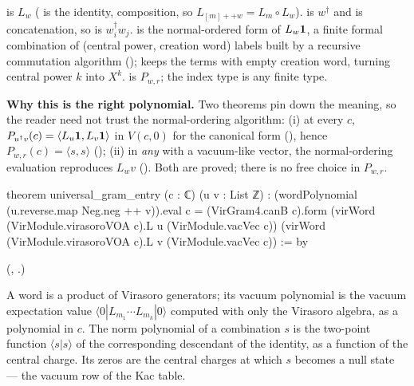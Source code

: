 \begin{dictionary}
 is $L_w$ ( is the identity, \lean{*} composition, so $L_{[m]++w} = L_m\circ L_w$).
 is $w^\dagger$ and \lean{++} is concatenation, so
 is $w_i^\dagger w_j$.  is the normal-ordered form
of $L_w\mathbf{1}$, a finite formal combination of (central power, creation word) labels built by a recursive
commutation algorithm (); 
keeps the terms with empty creation word, turning central power $k$ into $X^k$. 
is $P_{w,r}$; the index type  is any finite type.

\textbf{Why this is the right polynomial.} Two theorems pin down the meaning, so the reader need not
trust the normal-ordering algorithm: (i) at every $c$, $P_{u^\dagger v}(c) = \langle L_u\mathbf{1},L_v\mathbf{1}\rangle$ in
$V(c,0)$ for the canonical form (), hence
$P_{w,r}(c) = \langle s,s\rangle$ (); (ii) in \emph{any}
 with a vacuum-like vector, the normal-ordering evaluation reproduces
$L_wv$ (). Both are proved; there is no free choice in $P_{w,r}$.
\end{dictionary}
\begin{leancode}
theorem universal_gram_entry (c : ℂ) (u v : List ℤ) :
    (wordPolynomial (u.reverse.map Neg.neg ++ v)).eval c =
      (VirGram4.canB c).form
        (virWord (VirModule.virasoroVOA c).L u (VirModule.vacVec c))
        (virWord (VirModule.virasoroVOA c).L v (VirModule.vacVec c)) := by
\end{leancode}
(, .)

\begin{physics}
A word is a product of Virasoro generators; its vacuum polynomial is the vacuum expectation value
$\langle0|L_{m_1}\cdots L_{m_k}|0\rangle$ computed with only the Virasoro algebra, as a polynomial in $c$. The norm
polynomial of a combination $s$ is the two-point function $\langle s|s\rangle$ of the corresponding descendant of the
identity, as a function of the central charge. Its zeros are the central charges at which $s$ becomes a null
state --- the vacuum row of the Kac table.
\end{physics}

